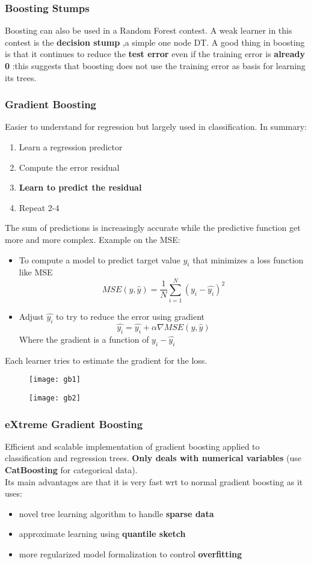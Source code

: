 \subsubsection{Boosting Stumps}
Boosting can also be used in a Random Forest contest. A weak learner in this contest is the \textbf{decision stump} ,a simple one node DT. A good thing in boosting is that it continues to reduce the \textbf{test error} even if the training error is \textbf{already 0} :this suggests that boosting does not use the training error as basis for learning its trees.

\subsubsection{Gradient Boosting}
Easier to understand for regression but largely used in classification. In summary:
\begin{enumerate}
\item Learn a regression predictor
\item Compute the error residual
\item \textbf{Learn to predict the residual}
\item Repeat 2-4 
\end{enumerate}
The sum of predictions is increasingly accurate while the predictive function get more and more complex.
Example on the MSE:
\begin{itemize}
\item To compute a model to predict target value $y_i$ that minimizes a loss function like MSE $$ MSE(y,\hat{y}) = \frac{1}{N}\sum \limits_{i=1}^{N}(y_i - \hat{y_i})^2$$
\item Adjust $\hat{y_i}$ to try to reduce the error using gradient 
$$ \hat{y_i} = \hat{y_i} + \alpha \nabla MSE(y,\hat{y})$$
Where the gradient is a function of $y_i - \hat{y_i}$
\end{itemize}
Each learner tries to estimate the gradient for the loss.
\begin{figure}[H]
  \centering
  \texttt{[image: gb1]}
\end{figure}\begin{figure}[H]
  \centering
  \texttt{[image: gb2]}
\end{figure}

\subsubsection{eXtreme Gradient Boosting}
Efficient  and scalable implementation of gradient boosting applied to classification and regression trees. \textbf{Only deals with numerical variables} (use \textbf{CatBoosting} for categorical data).\\
Its main advantages are that it is very fast wrt to normal gradient boosting as it uses:
\begin{itemize}
\item novel tree learning algorithm to handle \textbf{sparse data}
\item approximate learning using \textbf{quantile sketch}
\item more regularized model formalization to control \textbf{overfitting}
\end{itemize}

